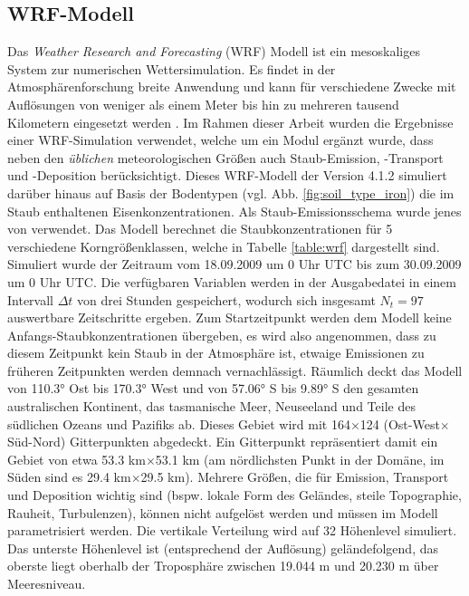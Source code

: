 \documentclass[12pt,a4paper,onecolumn]{scrartcl}
\begin{document}
\subsection{WRF-Modell} \label{sec:wrf}
Das \textit{Weather Research and Forecasting} (WRF) Modell ist ein mesoskaliges System zur numerischen Wettersimulation. Es findet in der Atmosphärenforschung breite Anwendung und kann für verschiedene Zwecke mit Auflösungen von weniger als einem Meter bis hin zu mehreren tausend Kilometern eingesetzt werden \citep{NCAR.2021}. Im Rahmen dieser Arbeit wurden die Ergebnisse einer WRF-Simulation verwendet, welche um ein Modul ergänzt wurde, dass neben den \textit{üblichen} meteorologischen Größen auch Staub-Emission, -Transport und -Deposition berücksichtigt. Dieses WRF-Modell der Version 4.1.2 simuliert darüber hinaus auf Basis der Bodentypen (vgl. Abb. \ref{fig:soil_type_iron}) die im Staub enthaltenen Eisenkonzentrationen. Als Staub-Emissionsschema wurde jenes von \citet{Shao.2004} verwendet. Das Modell berechnet die Staubkonzentrationen für 5 verschiedene Korngrößenklassen, welche in Tabelle \ref{table:wrf} dargestellt sind. Simuliert wurde der Zeitraum vom 18.09.2009 um 0 Uhr UTC bis zum 30.09.2009 um 0 Uhr UTC. Die verfügbaren Variablen werden in der Ausgabedatei in einem Intervall $\Delta t$ von drei Stunden gespeichert, wodurch sich insgesamt $N_t = 97$ auswertbare Zeitschritte ergeben. Zum Startzeitpunkt werden dem Modell keine Anfangs-Staubkonzentrationen übergeben, es wird also angenommen, dass zu diesem Zeitpunkt kein Staub in der Atmosphäre ist, etwaige Emissionen zu früheren Zeitpunkten werden demnach vernachlässigt. Räumlich deckt das Modell von 110.3° Ost bis 170.3° West und von 57.06° S bis 9.89° S den gesamten australischen Kontinent, das tasmanische Meer, Neuseeland und Teile des südlichen Ozeans und Pazifiks ab. Dieses Gebiet wird mit 164$\times$124 (Ost-West$\times$Süd-Nord) Gitterpunkten abgedeckt. Ein Gitterpunkt repräsentiert damit ein Gebiet von etwa 53.3 km$\times$53.1 km (am nördlichsten Punkt in der Domäne, im Süden sind es 29.4 km$\times$29.5 km). Mehrere Größen, die für Emission, Transport und Deposition wichtig sind (bspw. lokale Form des Geländes, steile Topographie, Rauheit, Turbulenzen), können nicht aufgelöst werden und müssen im Modell parametrisiert werden. Die vertikale Verteilung wird auf 32 Höhenlevel simuliert. Das unterste Höhenlevel ist (entsprechend der Auflösung) geländefolgend, das oberste liegt oberhalb der Troposphäre zwischen 19.044 m und 20.230 m über Meeresniveau.
\end{document}
